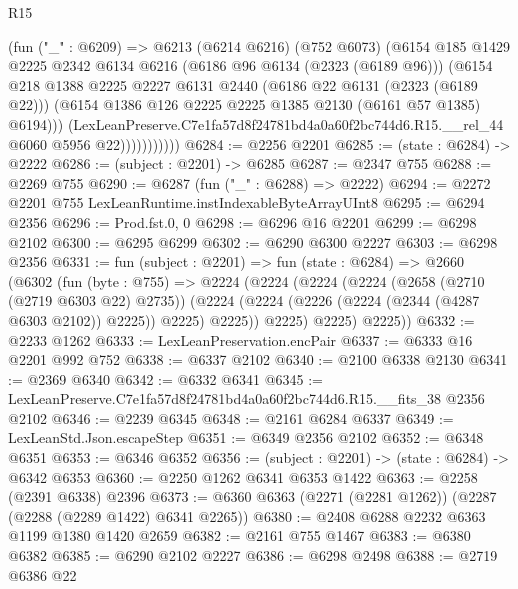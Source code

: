 \begin{lexlean}{R15}
\begin{coremodule}
                      (fun ("_" : @6209) =>
                      @6213
                        (@6214 @6216)
                        (@752 @6073)
                        (@6154
                          @185
                          @1429
                          @2225
                          @2342
                          @6134
                          @6216
                          (@6186 @96 @6134 (@2323 (@6189 @96)))
                          (@6154
                            @218
                            @1388
                            @2225
                            @2227
                            @6131
                            @2440
                            (@6186 @22 @6131 (@2323 (@6189 @22)))
                            (@6154 @1386 @126 @2225 @2225 @1385 @2130 (@6161 @57 @1385) @6194)))
                        (LexLeanPreserve.C7e1fa57d8f24781bd4a0a60f2bc744d6.R15.__rel_44
                          @6060
                          @5956
                          @22)))))))))))
@6284 := @2256 @2201
@6285 := (state : @6284) -> @2222
@6286 := (subject : @2201) -> @6285
@6287 := @2347 @755
@6288 := @2269 @755
@6290 := @6287 (fun ("_" : @6288) => @2222)
@6294 := @2272 @2201 @755 LexLeanRuntime.instIndexableByteArrayUInt8
@6295 := @6294 @2356
@6296 := Prod.fst.{0, 0}
@6298 := @6296 @16 @2201
@6299 := @6298 @2102
@6300 := @6295 @6299
@6302 := @6290 @6300 @2227
@6303 := @6298 @2356
@6331 := fun (subject : @2201) =>
  fun (state : @6284) =>
  @2660
    (@6302
      (fun (byte : @755) =>
      @2224
        (@2224
          (@2224
            (@2224
              (@2658 (@2710 (@2719 @6303 @22) @2735))
              (@2224 (@2224 (@2226 (@2224 (@2344 (@4287 @6303 @2102)) @2225)) @2225) @2225))
            @2225)
          @2225)
        @2225))
@6332 := @2233 @1262
@6333 := LexLeanPreservation.encPair
@6337 := @6333 @16 @2201 @992 @752
@6338 := @6337 @2102
@6340 := @2100 @6338 @2130
@6341 := @2369 @6340
@6342 := @6332 @6341
@6345 := LexLeanPreserve.C7e1fa57d8f24781bd4a0a60f2bc744d6.R15.__fits_38 @2356 @2102
@6346 := @2239 @6345
@6348 := @2161 @6284 @6337
@6349 := LexLeanStd.Json.escapeStep
@6351 := @6349 @2356 @2102
@6352 := @6348 @6351
@6353 := @6346 @6352
@6356 := (subject : @2201) -> (state : @6284) -> @6342 @6353
@6360 := @2250 @1262 @6341 @6353 @1422
@6363 := @2258 (@2391 @6338) @2396
@6373 := @6360 @6363 (@2271 (@2281 @1262)) (@2287 (@2288 (@2289 @1422) @6341 @2265))
@6380 := @2408 @6288 @2232 @6363 @1199 @1380 @1420 @2659
@6382 := @2161 @755 @1467
@6383 := @6380 @6382
@6385 := @6290 @2102 @2227
@6386 := @6298 @2498
@6388 := @2719 @6386 @22

\end{coremodule}
\end{lexlean}
